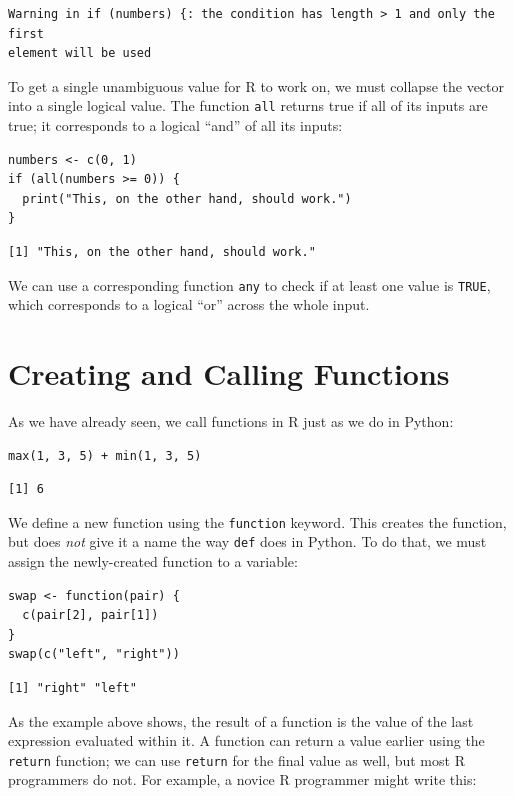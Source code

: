 \begin{lstlisting}
Warning in if (numbers) {: the condition has length > 1 and only the first
element will be used
\end{lstlisting}

To get a single unambiguous value for R to work on,
we must collapse the vector into a single logical value.
The function \texttt{all} returns true if all of its inputs are true;
it corresponds to a logical ``and'' of all its inputs:

\begin{lstlisting}
numbers <- c(0, 1)
if (all(numbers >= 0)) {
  print("This, on the other hand, should work.")
}
\end{lstlisting}

\begin{lstlisting}
[1] "This, on the other hand, should work."
\end{lstlisting}

We can use a corresponding function \texttt{any} to check if at least one value is \texttt{TRUE},
which corresponds to a logical ``or'' across the whole input.

\section{Creating and Calling Functions}

As we have already seen,
we call functions in R just as we do in Python:

\begin{lstlisting}
max(1, 3, 5) + min(1, 3, 5)
\end{lstlisting}

\begin{lstlisting}
[1] 6
\end{lstlisting}

We define a new function using the \texttt{function} keyword.
This creates the function,
but does \emph{not} give it a name the way \texttt{def} does in Python.
To do that,
we must assign the newly-created function to a variable:

\begin{lstlisting}
swap <- function(pair) {
  c(pair[2], pair[1])
}
swap(c("left", "right"))
\end{lstlisting}

\begin{lstlisting}
[1] "right" "left" 
\end{lstlisting}

As the example above shows,
the result of a function is the value of the last expression evaluated within it.
A function can return a value earlier using the \texttt{return} function;
we can use \texttt{return} for the final value as well,
but most R programmers do not.
For example,
a novice R programmer might write this:


